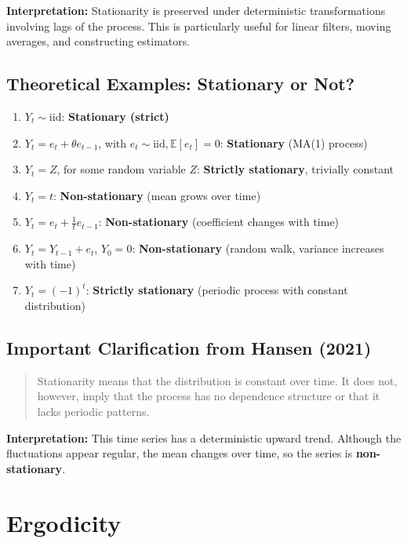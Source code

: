 \documentclass[12pt, oneside]{article}
\begin{document}
\textbf{Interpretation:} Stationarity is preserved under deterministic transformations involving lags of the process. This is particularly useful for linear filters, moving averages, and constructing estimators.

\subsection*{Theoretical Examples: Stationary or Not?}

\begin{enumerate}
    \item \( Y_t \sim \text{iid} \): \textbf{Stationary (strict)}
    \item \( Y_t = e_t + \theta e_{t-1} \), with \( e_t \sim \text{iid}, \mathbb{E}[e_t] = 0 \): \textbf{Stationary} (MA(1) process)
    \item \( Y_t = Z \), for some random variable \( Z \): \textbf{Strictly stationary}, trivially constant
    \item \( Y_t = t \): \textbf{Non-stationary} (mean grows over time)
    \item \( Y_t = e_t + \frac{1}{t} e_{t-1} \): \textbf{Non-stationary} (coefficient changes with time)
    \item \( Y_t = Y_{t-1} + e_t \), \( Y_0 = 0 \): \textbf{Non-stationary} (random walk, variance increases with time)
    \item \( Y_t = (-1)^t \): \textbf{Strictly stationary} (periodic process with constant distribution)
\end{enumerate}

\subsection*{Important Clarification from Hansen (2021)}

\begin{quote}
Stationarity means that the distribution is constant over time. It does not, however, imply that the process has no dependence structure or that it lacks periodic patterns.
\end{quote}

\textbf{Interpretation:} This time series has a deterministic upward trend. Although the fluctuations appear regular, the mean changes over time, so the series is \textbf{non-stationary}.

\section*{Ergodicity}
\end{document}
